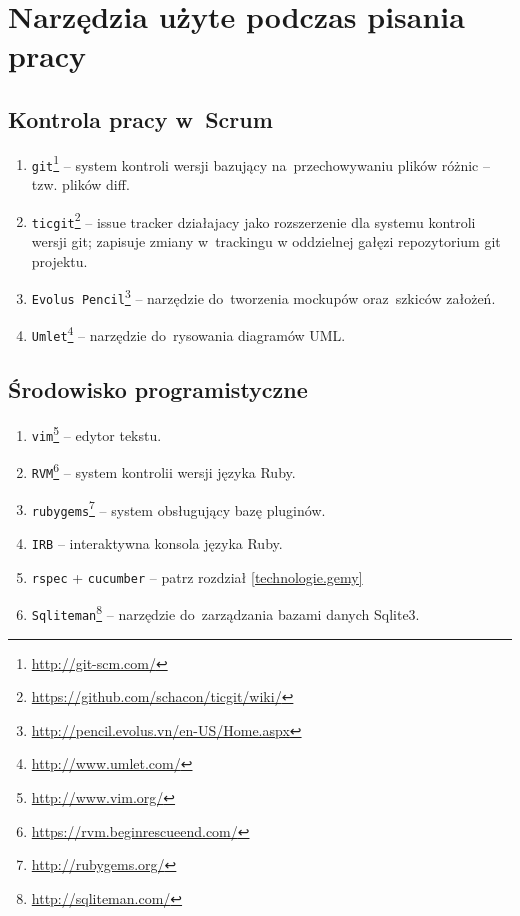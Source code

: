 \section{Narzędzia użyte podczas pisania pracy}

\subsection{Kontrola pracy w~Scrum}

\begin{enumerate}
  \item \texttt{git}\footnote{\url{http://git-scm.com/}} -- system kontroli wersji bazujący na~przechowywaniu plików różnic -- tzw. plików diff.
  \item \texttt{ticgit}\footnote{\url{https://github.com/schacon/ticgit/wiki/}} -- issue tracker działajacy jako rozszerzenie dla systemu kontroli wersji git; zapisuje zmiany w~trackingu w oddzielnej gałęzi repozytorium git projektu.
  \item \texttt{Evolus Pencil}\footnote{\url{http://pencil.evolus.vn/en-US/Home.aspx}} -- narzędzie do~tworzenia mockupów oraz~szkiców założeń.
  \item \texttt{Umlet}\footnote{\url{http://www.umlet.com/}} -- narzędzie do~rysowania diagramów UML.
\end{enumerate}

\subsection{Środowisko programistyczne}

\begin{enumerate}
  \item \texttt{vim}\footnote{\url{http://www.vim.org/}} -- edytor tekstu.
  \item \texttt{RVM}\footnote{\url{https://rvm.beginrescueend.com/}} -- system kontrolii wersji języka Ruby.
  \item \texttt{rubygems}\footnote{\url{http://rubygems.org/}} -- system obsługujący bazę pluginów.
  \item \texttt{IRB} -- interaktywna konsola języka Ruby.
  \item \texttt{rspec} + \texttt{cucumber} -- patrz rozdział \ref{technologie.gemy}
  \item \texttt{Sqliteman}\footnote{\url{http://sqliteman.com/}} -- narzędzie do~zarządzania bazami danych Sqlite3.
\end{enumerate}

